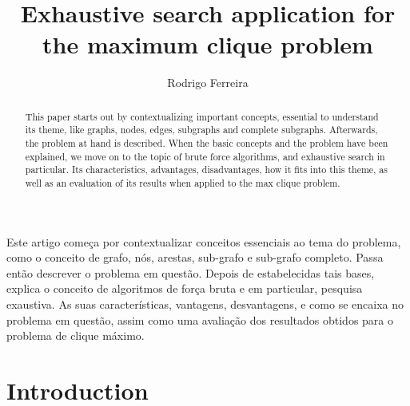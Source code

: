 \documentclass[...]{revdetua}
\begin{document}

\title{Exhaustive search application for the maximum clique problem}
\author{Rodrigo Ferreira} %
\maketitle

\begin{resumo}%
	Este artigo começa por contextualizar conceitos essenciais ao tema do problema, como o conceito de grafo, nós, arestas, sub-grafo e sub-grafo completo. Passa então descrever o problema em questão. Depois de estabelecidas tais bases, explica o conceito de algoritmos de força bruta e em particular, pesquisa exaustiva. As suas características, vantagens, desvantagens, e como se encaixa no problema em questão, assim como uma avaliação dos resultados obtidos para o problema de clique máximo.
\end{resumo}

\begin{abstract}%
  This paper starts out by contextualizing important concepts, essential to understand its theme, like graphs, nodes, edges, subgraphs and complete subgraphs. Afterwards, the problem at hand is described. When the basic concepts and the problem have been explained, we move on to the topic of brute force algorithms, and exhaustive search in particular. Its characteristics, advantages, disadvantages, how it fits into this theme, as well as an evaluation of its results when applied to the max clique problem.
\end{abstract}
\section{Introduction}
\end{document}
